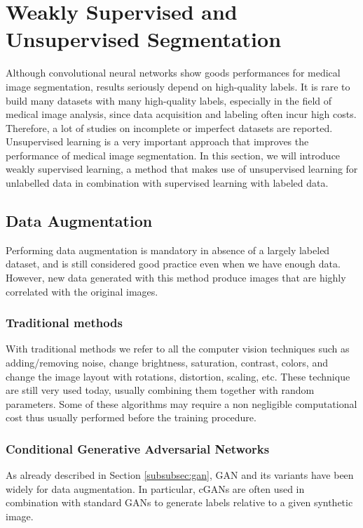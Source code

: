\section{Weakly Supervised and Unsupervised Segmentation}
Although convolutional neural networks show goods performances for medical
image segmentation, results seriously depend on high-quality
labels. It is rare to build many datasets with many high-quality labels,
especially in the field of medical image analysis, since data acquisition and
labeling often incur high costs. Therefore, a lot of studies on incomplete or
imperfect datasets are reported. Unsupervised learning is a very important approach that improves the performance of medical image segmentation. In this
section, we will introduce weakly supervised learning, a method that makes
use of unsupervised learning for unlabelled data in combination with supervised
learning with labeled data.

\subsection{Data Augmentation}
Performing data augmentation is mandatory in absence of a largely labeled dataset, and is still considered good practice even when we have enough data. However, new data generated with this method produce images that are highly correlated with the original images.

\subsubsection{Traditional methods}
With traditional methods we refer to all the computer vision techniques such as adding/removing noise, change brightness, saturation, contrast, colors, and change the image layout with rotations, distortion, scaling, etc. These technique are still very used today, usually combining them together with random parameters. Some of these algorithms may require a non negligible computational cost thus usually performed before the training procedure.

\subsubsection{Conditional Generative Adversarial Networks}
As already described in Section \ref{subsubsec:gan}, GAN and its variants have been widely for data augmentation. In particular, cGANs are often used in combination with standard GANs to generate labels relative to a given synthetic image.

